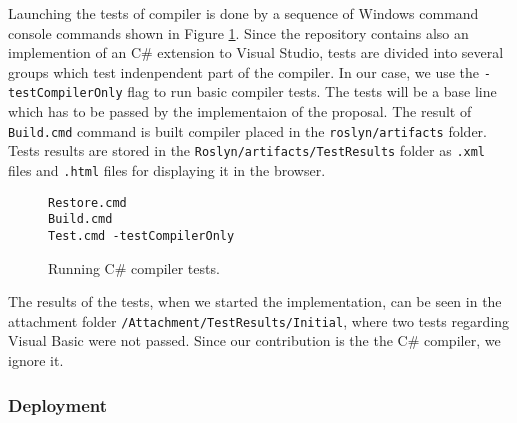 Launching the tests of compiler is done by a sequence of Windows command console commands shown in Figure \ref{img65:runTests}.
Since the repository contains also an implemention of an C\# extension to Visual Studio, tests are divided into several groups which test indenpendent part of the compiler.
In our case, we use the \texttt{-testCompilerOnly} flag to run basic compiler tests.
The tests will be a base line which has to be passed by the implementaion of the proposal.
The result of \texttt{Build.cmd} command is built compiler placed in the \texttt{roslyn/artifacts} folder.
Tests results are stored in the \texttt{Roslyn/artifacts/TestResults} folder as \texttt{.xml} files and \texttt{.html} files for displaying it in the browser.
\begin{figure}[h]
\begin{lstlisting}
Restore.cmd
Build.cmd
Test.cmd -testCompilerOnly
\end{lstlisting}
\caption{Running C\# compiler tests.}
\label{img65:runTests}
\end{figure}
\par
The results of the tests, when we started the implementation, can be seen in the attachment folder \texttt{/Attachment/TestResults/Initial}, where two tests regarding Visual Basic were not passed.
Since our contribution is the the C\# compiler, we ignore it.

\subsubsection{Deployment}

